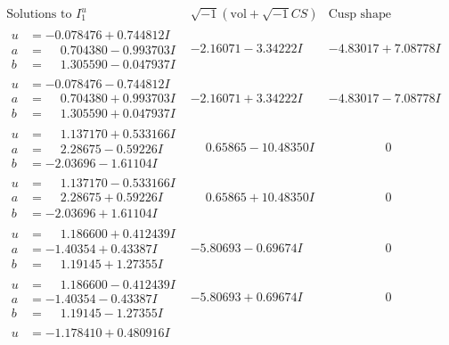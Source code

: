 \documentclass[1p]{elsarticle_modified}
\theoremstyle{definition}
\newcommand{\I}{\sqrt{-1}}
\begin{document}
$$\begin{array}{c|c|c}
\text{Solutions to }I^u_{1}& \I (\text{vol} + \sqrt{-1}CS) & \text{Cusp shape}\\
 \hline 
\begin{aligned}
u &= -0.078476 + 0.744812 I \\
a &= \phantom{-}0.704380 - 0.993703 I \\
b &= \phantom{-}1.305590 - 0.047937 I\end{aligned}
 & -2.16071 - 3.34222 I & -4.83017 + 7.08778 I \\ \hline\begin{aligned}
u &= -0.078476 - 0.744812 I \\
a &= \phantom{-}0.704380 + 0.993703 I \\
b &= \phantom{-}1.305590 + 0.047937 I\end{aligned}
 & -2.16071 + 3.34222 I & -4.83017 - 7.08778 I \\ \hline\begin{aligned}
u &= \phantom{-}1.137170 + 0.533166 I \\
a &= \phantom{-}2.28675 - 0.59226 I \\
b &= -2.03696 - 1.61104 I\end{aligned}
 & \phantom{-}0.65865 - 10.48350 I & \phantom{-0.000000 } 0 \\ \hline\begin{aligned}
u &= \phantom{-}1.137170 - 0.533166 I \\
a &= \phantom{-}2.28675 + 0.59226 I \\
b &= -2.03696 + 1.61104 I\end{aligned}
 & \phantom{-}0.65865 + 10.48350 I & \phantom{-0.000000 } 0 \\ \hline\begin{aligned}
u &= \phantom{-}1.186600 + 0.412439 I \\
a &= -1.40354 + 0.43387 I \\
b &= \phantom{-}1.19145 + 1.27355 I\end{aligned}
 & -5.80693 - 0.69674 I & \phantom{-0.000000 } 0 \\ \hline\begin{aligned}
u &= \phantom{-}1.186600 - 0.412439 I \\
a &= -1.40354 - 0.43387 I \\
b &= \phantom{-}1.19145 - 1.27355 I\end{aligned}
 & -5.80693 + 0.69674 I & \phantom{-0.000000 } 0 \\ \hline\begin{aligned}
u &= -1.178410 + 0.480916 I \\

\end{aligned}
\end{array}$$
\end{document}
